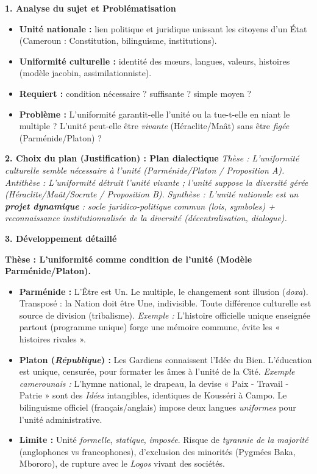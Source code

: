 \documentclass[11pt]{article}
\newcounter{popsec}
\newcounter{popsub}
\newcommand{\courssub}[1]{%
  \stepcounter{popsub}%
  \par\vspace{9pt}\noindent{\popxbold\fontsize{11.5}{13}\selectfont\color{popink}{\color{poporange}\thepopsec.\thepopsub}\hspace{6pt}#1}\par\nopagebreak\vspace{4pt}
}
\begin{document}
\courssub{Démarche et corrigé commenté}
\begin{exoresolu}
\textbf{1. Analyse du sujet et Problématisation}
\begin{itemize}
    \item \textbf{Unité nationale :} lien politique et juridique unissant les citoyens d'un État (Cameroun : Constitution, bilinguisme, institutions).
    \item \textbf{Uniformité culturelle :} identité des mœurs, langues, valeurs, histoires (modèle jacobin, assimilationniste).
    \item \textbf{Requiert :} condition nécessaire ? suffisante ? simple moyen ?
    \item \textbf{Problème :} L'uniformité garantit-elle l'unité ou la tue-t-elle en niant le multiple ? L'unité peut-elle être \emph{vivante} (Héraclite/Maât) sans être \emph{figée} (Parménide/Platon) ?
\end{itemize}

\textbf{2. Choix du plan (Justification) : Plan dialectique}
\emph{Thèse : L'uniformité culturelle semble nécessaire à l'unité (Parménide/Platon / Proposition A).}
\emph{Antithèse : L'uniformité détruit l'unité vivante ; l'unité suppose la diversité gérée (Héraclite/Maât/Socrate / Proposition B).}
\emph{Synthèse : L'unité nationale est un \textbf{projet dynamique} : socle juridico-politique commun (lois, symboles) + reconnaissance institutionnalisée de la diversité (décentralisation, dialogue).}

\textbf{3. Développement détaillé}

\textbf{Thèse : L'uniformité comme condition de l'unité (Modèle Parménide/Platon).}\par
\begin{itemize}
    \item \textbf{Parménide :} L'Être est Un. Le multiple, le changement sont illusion (\emph{doxa}). Transposé : la Nation doit être Une, indivisible. Toute différence culturelle est source de division (tribalisme). \emph{Exemple :} L'histoire officielle unique enseignée partout (programme unique) forge une mémoire commune, évite les « histoires rivales ».
    \item \textbf{Platon (\emph{République}) :} Les Gardiens connaissent l'Idée du Bien. L'éducation est unique, censurée, pour formater les âmes à l'unité de la Cité. \emph{Exemple camerounais :} L'hymne national, le drapeau, la devise « Paix - Travail - Patrie » sont des \emph{Idées} intangibles, identiques de Kousséri à Campo. Le bilinguisme officiel (français/anglais) impose deux langues \emph{uniformes} pour l'unité administrative.
    \item \textbf{Limite :} Unité \emph{formelle}, \emph{statique}, \emph{imposée}. Risque de \emph{tyrannie de la majorité} (anglophones vs francophones), d'exclusion des minorités (Pygmées Baka, Mbororo), de rupture avec le \emph{Logos} vivant des sociétés.
\end{itemize}


\end{exoresolu}
\end{document}
